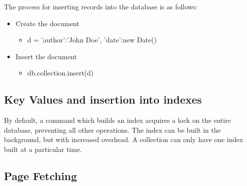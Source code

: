 \documentclass{dependencies/acm_proc_article-sp}
\begin{document}
The process for inserting records into the database is as follows:
\begin{itemize}
  \item Create the document
  \begin{itemize}
    \item d = {'author':'John Doe', 'date':new Date() }
  \end{itemize}

  \item Insert the document
  \begin{itemize}
    \item db.collection.insert(d)
  \end{itemize}
\end{itemize}

\subsection{Key Values and insertion into indexes}
By default, a command which builds an index acquires a lock on the entire database,
preventing all other operations. The index can be built in the background,
but with increased overhead.
A collection can only have one index built at a particular time\cite{7}.
\subsection{Page Fetching}
\end{document}
